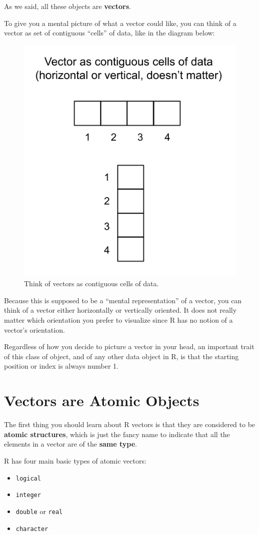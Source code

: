 \documentclass[
]{book}
\begin{document}
As we said, all these objects are \textbf{vectors}.

To give you a mental picture of what a vector could like, you can think of a
vector as set of contiguous ``cells'' of data, like in the diagram below:

\begin{figure}

{\centering \includegraphics[width=0.4\linewidth]{images/objects/obj-vectors} 

}

\caption{Think of vectors as contiguous cells of data.}\label{fig:unnamed-chunk-16}
\end{figure}

Because this is supposed to be a ``mental representation'' of a vector, you can
think of a vector either horizontally or vertically oriented. It does not
really matter which orientation you prefer to visualize since R has no notion
of a vector's orientation.

Regardless of how you decide to picture a vector in your head, an important
trait of this class of object, and of any other data object in R, is that the
starting position or index is always number 1.

\hypertarget{vectors-are-atomic-objects}{%
\section{Vectors are Atomic Objects}\label{vectors-are-atomic-objects}}

The first thing you should learn about R vectors is that they are considered to
be \textbf{atomic structures}, which is just the fancy name to indicate that all the
elements in a vector are of the \textbf{same type}.

R has four main basic types of atomic vectors:

\begin{itemize}
\item
  \texttt{logical}
\item
  \texttt{integer}
\item
  \texttt{double} or \texttt{real}
\item
  \texttt{character}
\end{itemize}
\end{document}

